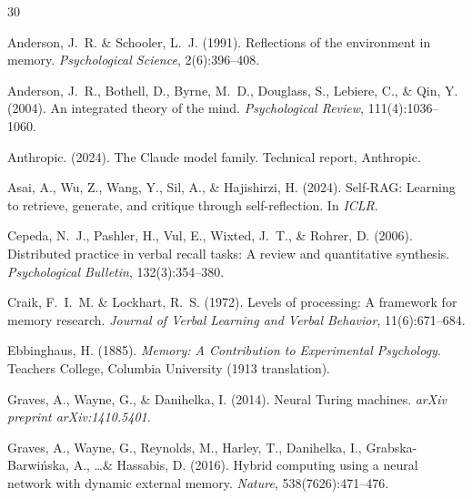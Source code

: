 \documentclass[11pt,a4paper]{article}
\begin{document}


\begin{thebibliography}{30}

Anderson, J.~R. \& Schooler, L.~J. (1991).
\newblock Reflections of the environment in memory.
\newblock \textit{Psychological Science}, 2(6):396--408.

Anderson, J.~R., Bothell, D., Byrne, M.~D., Douglass, S., Lebiere, C., \& Qin, Y. (2004).
\newblock An integrated theory of the mind.
\newblock \textit{Psychological Review}, 111(4):1036--1060.

Anthropic. (2024).
\newblock The Claude model family.
\newblock Technical report, Anthropic.

Asai, A., Wu, Z., Wang, Y., Sil, A., \& Hajishirzi, H. (2024).
\newblock Self-{RAG}: Learning to retrieve, generate, and critique through self-reflection.
\newblock In \textit{ICLR}.

Cepeda, N.~J., Pashler, H., Vul, E., Wixted, J.~T., \& Rohrer, D. (2006).
\newblock Distributed practice in verbal recall tasks: A review and quantitative synthesis.
\newblock \textit{Psychological Bulletin}, 132(3):354--380.

Craik, F.~I.~M. \& Lockhart, R.~S. (1972).
\newblock Levels of processing: A framework for memory research.
\newblock \textit{Journal of Verbal Learning and Verbal Behavior}, 11(6):671--684.

Ebbinghaus, H. (1885).
\newblock \textit{Memory: A Contribution to Experimental Psychology}.
\newblock Teachers College, Columbia University (1913 translation).

Graves, A., Wayne, G., \& Danihelka, I. (2014).
\newblock Neural {T}uring machines.
\newblock \textit{arXiv preprint arXiv:1410.5401}.

Graves, A., Wayne, G., Reynolds, M., Harley, T., Danihelka, I., Grabska-Barwi\'{n}ska, A., \ldots \& Hassabis, D. (2016).
\newblock Hybrid computing using a neural network with dynamic external memory.
\newblock \textit{Nature}, 538(7626):471--476.


\end{thebibliography}
\end{document}
